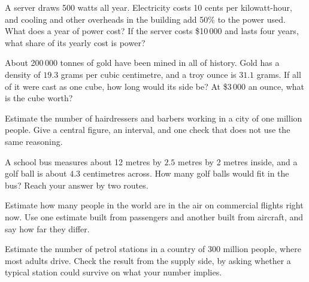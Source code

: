 \begin{question}\label{iq:iv1:estimation:6}
A server draws 500 watts all year. Electricity costs 10 cents per kilowatt-hour, and cooling and other overheads in the building add 50\% to the power used. What does a year of power cost? If the server costs \$10\,000 and lasts four years, what share of its yearly cost is power?
\end{question}

\begin{question}\label{iq:iv1:estimation:7}
About 200\,000 tonnes of gold have been mined in all of history. Gold has a density of $19.3$ grams per cubic centimetre, and a troy ounce is $31.1$ grams. If all of it were cast as one cube, how long would its side be? At \$3\,000 an ounce, what is the cube worth?
\end{question}

\begin{question}\label{iq:iv1:estimation:8}
Estimate the number of hairdressers and barbers working in a city of one million people. Give a central figure, an interval, and one check that does not use the same reasoning.
\end{question}

\begin{question}\label{iq:iv1:estimation:9}
A school bus measures about 12 metres by $2.5$ metres by 2 metres inside, and a golf ball is about $4.3$ centimetres across. How many golf balls would fit in the bus? Reach your answer by two routes.
\end{question}

\begin{question}\label{iq:iv1:estimation:10}
Estimate how many people in the world are in the air on commercial flights right now. Use one estimate built from passengers and another built from aircraft, and say how far they differ.
\end{question}

\begin{question}\label{iq:iv1:estimation:11}
Estimate the number of petrol stations in a country of 300 million people, where most adults drive. Check the result from the supply side, by asking whether a typical station could survive on what your number implies.
\end{question}

